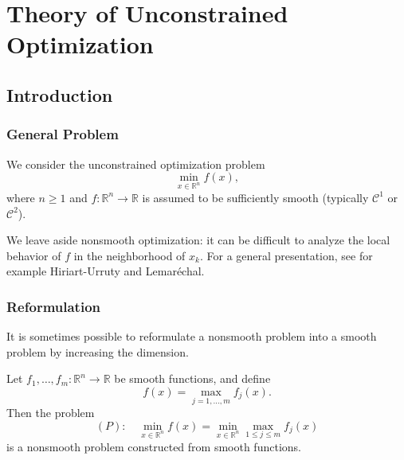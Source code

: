 \chapter{Theory of Unconstrained Optimization}
\label{chap:unconstrained}

\section{Introduction}
\label{sec:2.1}

\subsection{General Problem}
\label{subsec:2.1.1}

We consider the unconstrained optimization problem
\begin{equation}
    \min_{x \in \mathbb{R}^n} f(x),
\end{equation}
where $n \geq 1$ and $f : \mathbb{R}^n \to \mathbb{R}$ is assumed to be sufficiently smooth
(typically $\mathcal{C}^1$ or $\mathcal{C}^2$).

\begin{remarque}
We leave aside nonsmooth optimization: it can be difficult to analyze the
local behavior of $f$ in the neighborhood of $x_k$. For a general presentation,
see for example Hiriart-Urruty and Lemaréchal.
\end{remarque}

\subsection{Reformulation}
\label{subsec:2.1.2}

It is sometimes possible to reformulate a nonsmooth problem into a smooth problem
by increasing the dimension.

Let $f_1,\dots,f_m : \mathbb{R}^n \to \mathbb{R}$ be smooth functions, and define
\begin{equation}
    f(x) = \max_{j=1,\dots,m} f_j(x).
\end{equation}
Then the problem
\begin{equation}
    (P) :\quad \min_{x \in \mathbb{R}^n} f(x)
        = \min_{x \in \mathbb{R}^n} \max_{1 \le j \le m} f_j(x)
\end{equation}
is a nonsmooth problem constructed from smooth functions.

